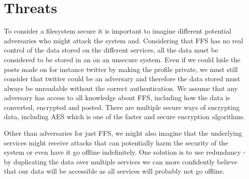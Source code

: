 \section{Threats}
To consider a filesystem secure it is important to imagine different potential adversaries who might attack the system and. Considering that FFS has no real control of the data stored on the different services, all the data must be considered to be stored in an on an unsecure system. Even if we could hide the posts made on for instance twitter by making the profile private, we must still consider that twitter could be an adversary and therefore the data stored must always be unreadable without the correct authentication. We assume that any adversary has access to all knowledge about FFS, including how the data is converted, encrypted and posted. There are multiple secure ways of encrypting data, including AES which is one of the faster and secure encryption algorithms\cite{mahajanStudyEncryptionAlgorithms2013}.

Other than adversaries for just FFS, we might also imagine that the underlying services might receive attacks that can potentially harm the security of the system or even have it go offline indefinitely. One solution is to use redundancy - by duplicating the data over multiple services we can more confidently believe that our data will be accessible as all services will probably not go offline. 